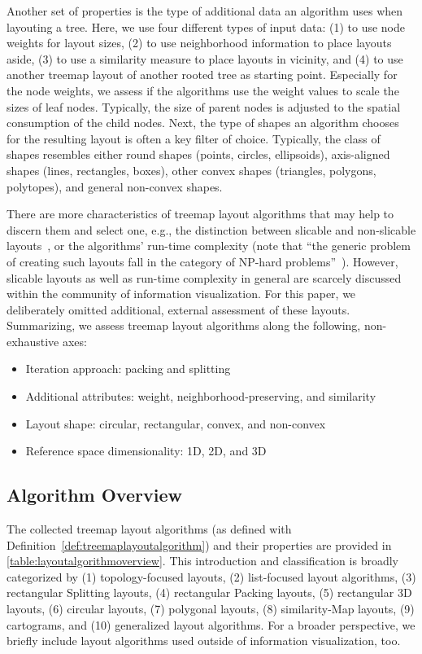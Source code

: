 \documentclass[sigconf%
,natbib=true%
]{acmart}
\begin{document}
Another set of properties is the type of additional data an algorithm uses when layouting a tree.
Here, we use four different types of input data: (1) to use node weights for layout sizes, (2) to use neighborhood information to place layouts aside, (3) to use a similarity measure to place layouts in vicinity, and (4) to use another treemap layout of another rooted tree as starting point.
Especially for the node weights, we assess if the algorithms use the weight values to scale the sizes of leaf nodes. Typically, the size of parent nodes is adjusted to the spatial consumption of the child nodes.
Next, the type of shapes an algorithm chooses for the resulting layout is often a key filter of choice.
Typically, the class of shapes resembles either round shapes (points, circles, ellipsoids), axis-aligned shapes (lines, rectangles, boxes), other convex shapes (triangles, polygons, polytopes), and general non-convex shapes.
\par
There are more characteristics of treemap layout algorithms that may help to discern them and select one, e.g., the distinction between slicable and non-slicable layouts~\cite{young2003-twinbinary}, or the algorithms' run-time complexity (note that \enquote{the generic problem of creating such layouts fall in the category of NP-hard problems}~\cite{baudel2012-designspace}).
However, slicable layouts as well as run-time complexity in general are scarcely discussed within the community of information visualization. For this paper, we deliberately omitted additional, external assessment of these layouts.
Summarizing, we assess treemap layout algorithms along the following, non-exhaustive axes:
\begin{itemize}
    \item Iteration approach: packing and splitting
    \item Additional attributes: weight, neighborhood-preserving, and similarity
    \item Layout shape: circular, rectangular, convex, and non-convex
    \item Reference space dimensionality: 1D, 2D, and 3D
\end{itemize}

\subsection{Algorithm Overview}
The collected treemap layout algorithms (as defined with Definition~\ref{def:treemaplayoutalgorithm}) and their properties are provided in \autoref{table:layoutalgorithmoverview}.
This introduction and classification is broadly categorized by
(1) topology-focused layouts,
(2) list-focused layout algorithms,
(3) rectangular Splitting layouts,
(4) rectangular Packing layouts,
(5) rectangular 3D layouts,
(6) circular layouts,
(7) polygonal layouts,
(8) similarity-Map layouts,
(9) cartograms, and
(10) generalized layout algorithms.
For a broader perspective, we briefly include layout algorithms used outside of information visualization, too.
\end{document}
